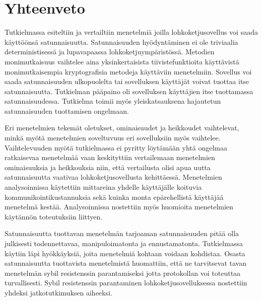 \chapter{Yhteenveto\label{conclusions}}

Tutkielmassa esiteltiin ja vertailtiin menetelmiä joilla lohkoketjusovellus voi saada käyttöönsä satunnaisuutta. Satunnaisuuden hyödyntäminen ei ole triviaalia deterministisessä ja lupavapaassa lohkoketjuympäristössä. Metodien monimutkaisuus vaihtelee aina yksinkertaisista tiivistefunktioita käyttävistä monimutkaisempia kryptografisia metodeja käyttäviin menetelmiin. Sovellus voi saada satunnaisuuden ulkopuolelta tai sovelluksen käyttäjät voivat tuottaa itse satunnaisuutta. Tutkielman pääpaino oli sovelluksen käyttäjien itse tuottamassa satunnaisuudessa. Tutkielma toimii myös yleiskatsauksena hajautetun satunnaisuuden tuottamisen ongelmaan.

Eri menetelmien tekemät oletukset, ominaisuudet ja heikkoudet vaihtelevat, minkä myötä menetelmien soveltuvuus eri sovelluksiin myös vaihtelee. Vaihtelevuuden myötä tutkielmassa ei pyritty löytämään yhtä ongelmaa ratkaisevaa menetelmää vaan keskityttiin vertailemaan menetelmien ominaisuuksia ja heikkouksia niin, että vertailusta olisi apua uutta satunnaisuutta vaativaa lohkoketjusovellusta kehittäessä. Menetelmien analysoinnissa käytettiin mittareina yhdelle käyttäjälle koituvia kommunikointikustannuksia sekä kuinka monta epärehellistä käyttäjää menetelmä kestää. Analysoinnissa nostettiin myös huomioita menetelmien käytännön toteutuksiin liittyen.

Satunnaisuutta tuottavan menetelmän tarjoaman satunnaisuuden pitää olla julkisesti todennettavaa, manipuloimatonta ja ennustamatonta. Tutkielmassa käytiin läpi hyökkäyksiä, joita menetelmiä kohtaan voidaan kohdistaa. Osasta satunnaisuutta tuottavista menetelmistä huomattiin, että ne tarvitsevat tavan menetelmän sybil resistenssin parantamiseksi jotta protokollan voi toteuttaa turvallisesti. Sybil resistenssin parantaminen lohkoketjusovelluksessa nostettiin yhdeksi jatkotutkimuksen aiheeksi.